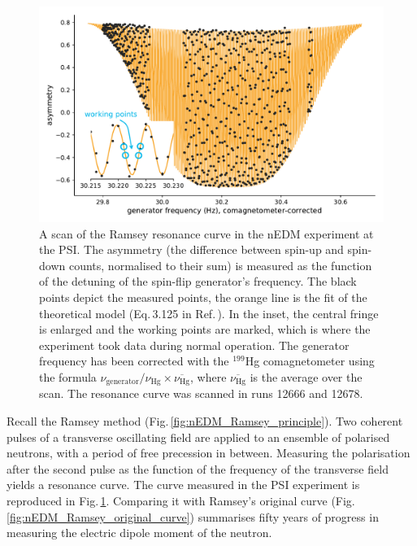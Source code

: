 \begin{figure}
  \centering
  \includegraphics[width=\linewidth]{gfx/nEDMatPSI/ramsey_scan.pdf}
  \caption{A scan of the Ramsey resonance curve in the nEDM experiment at the PSI\@.
  The asymmetry (the difference between spin-up and spin-down counts, normalised to their sum) is measured as the function of the detuning of the spin-flip generator's frequency.
  The black points depict the measured points, the orange line is the fit of the theoretical model (Eq.\,3.125 in Ref.\,\cite{May1998}).
  In the inset, the central fringe is enlarged and the working points are marked, which is where the experiment took data during normal operation.
  The generator frequency has been corrected with the $^{199}$Hg comagnetometer using the formula $\nu_\text{generator} / \nu_\text{Hg} \times \overline{\nu_\text{Hg}}$, where $\overline{\nu_\text{Hg}}$ is the average over the scan.
  The resonance curve was scanned in runs 12666 and 12678.}\label{fig:ramsey_scan}
\end{figure}

Recall the Ramsey method (Fig.\,\ref{fig:nEDM_Ramsey_principle}).
Two coherent pulses of a transverse oscillating field are applied to an ensemble of polarised neutrons, with a period of free precession in between.
Measuring the polarisation after the second pulse as the function of the frequency of the transverse field yields a resonance curve.
The curve measured in the PSI experiment is reproduced in Fig.\,\ref{fig:ramsey_scan}.
Comparing it with Ramsey's original curve (Fig.\,\ref{fig:nEDM_Ramsey_original_curve}) summarises fifty years of progress in measuring the electric dipole moment of the neutron.


